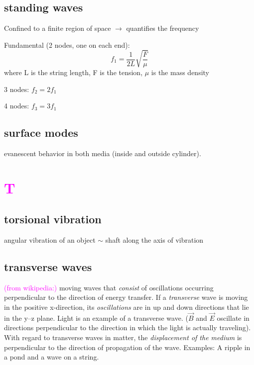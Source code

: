 \documentclass[12pt]{article}
\begin{document}
\subsection*{standing waves}
Confined to a finite region of space $\rightarrow$ quantifies the frequency
\begin{itemize*}
    \item Fundamental (2 nodes, one on each end):
        $$f_1 = \frac{1}{2L}\sqrt{\frac{F}{\mu}}$$
        where L is the string length, F is the tension, $\mu$ is the mass density
    \item 3 nodes: $f_2 = 2f_1$
    \item 4 nodes: $f_3 = 3f_1$
\end{itemize*}


\subsection*{surface modes}
evanescent behavior in both media (inside and outside cylinder).


\section*{\textcolor{magenta}{T}}

\subsection*{torsional vibration}
\begin{itemize*}
    \item angular vibration of an object $\sim$ shaft along the
        axis of vibration
\end{itemize*}

\subsection*{transverse waves}
\textcolor{magenta}{(from wikipedia:)}
moving waves that \emph{consist} of oscillations occurring perpendicular
to the direction of energy transfer.
If a \emph{transverse} wave is moving in the positive x-direction,
its \emph{oscillations} are in up and down directions that lie in the y–z plane.
Light is an example of a transverse wave.
($\vec B$ and $\vec E$ oscillate in directions perpendicular to the direction
in which the light is actually traveling).
With regard to transverse waves in matter,
the \emph{displacement of the medium} is perpendicular to the
direction of propagation of the wave.
Examples: A ripple in a pond and a wave on a string.
\end{document}
